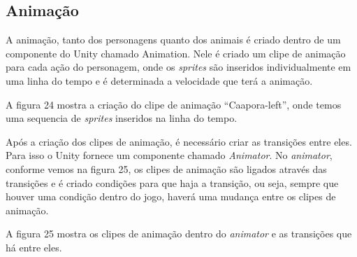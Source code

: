 \subsection{Animação}
A animação, tanto dos personagens quanto dos animais é criado dentro de um componente do Unity chamado Animation. Nele é criado um clipe de animação para cada ação do personagem, onde os \textit{sprites} são inseridos individualmente em uma linha do tempo e é determinada a velocidade que terá a animação.

A figura 24 mostra a criação do clipe de animação “Caapora-left”, onde temos uma sequencia de \textit{sprites} inseridos na linha do tempo.

\begin{figure}[h!]
		\centering
	\end{figure}


Após a criação dos clipes de animação, é necessário criar as transições entre eles. Para isso o Unity fornece um componente chamado \textit{Animator}. No \textit{animator}, conforme vemos na figura 25, os clipes de animação são ligados através das transições e é criado condições para que haja a transição, ou seja, sempre que houver uma condição dentro do jogo, haverá uma mudança entre os clipes de animação.
	
A figura 25 mostra os clipes de animação dentro do \textit{animator} e as transições que há entre eles.
\pagebreak

\begin{figure}[h!]
		\centering
	\end{figure}


